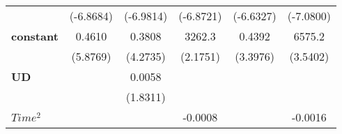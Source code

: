 \documentclass{article}
\begin{document}
\begin{table}[!htbp]
{\begin{tabular}{lccccc}
\textbf{ }                     &    (-6.8684)    &       (-6.9814)       &    (-6.8721)     &     (-6.6327)     &       (-7.0800)        \\
\textbf{constant}                 &      0.4610     &         0.3808        &      3262.3      &       0.4392      &         6575.2         \\
\textbf{ }                     &     (5.8769)    &        (4.2735)       &     (2.1751)     &      (3.3976)     &        (3.5402)        \\
\textbf{UD}                    &                 &         0.0058        &                  &                   &                        \\
\textbf{ }                     &                 &        (1.8311)       &                  &                   &                        \\
\textbf{$Time^2$}             &                 &                       &     -0.0008      &                   &        -0.0016         \\
\bottomrule
\end{tabular}}
\end{table}
\end{document}
